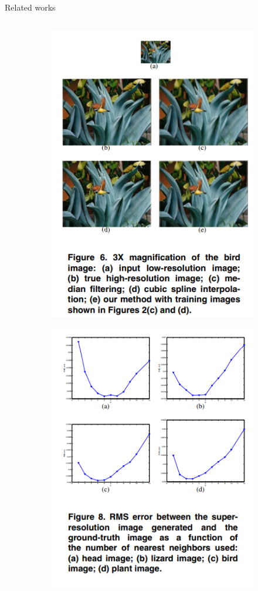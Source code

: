 \documentclass{beamer}
\begin{document}
\begin{frame}{Related works}
{\begin{columns}
\begin{column}{0.5\textwidth}
                \begin{figure}
                    \centering
                    \begin{subfigure}[l]{0.55\textwidth}
                        \vspace*{-50px}
                        \includegraphics[height=0.30\textheight, keepaspectratio]{result-neighbour-embedding.png}
                    \end{subfigure}
                    \begin{subfigure}[l]{0.55\textwidth}
                        \includegraphics[height=0.30\textheight, keepaspectratio]{rms-neighbour-embedding.png}                    

\end{subfigure}
\end{figure}
\end{column}
\end{columns}}
\end{frame}
\end{document}
